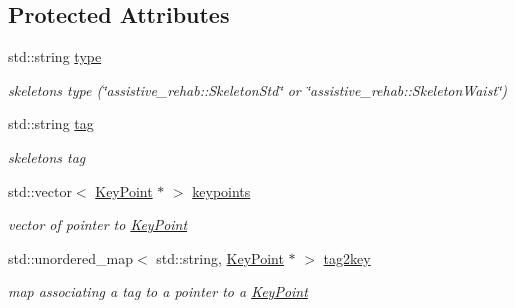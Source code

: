 \subsection*{Protected Attributes}
\begin{DoxyCompactItemize}
\item 
\mbox{\label{classassistive__rehab_1_1Skeleton_a679b826030f01f307d938e583f27d23b}} 
std\+::string \mbox{\hyperlink{classassistive__rehab_1_1Skeleton_a679b826030f01f307d938e583f27d23b}{type}}
\begin{DoxyCompactList}\small\item\em skeleton\textquotesingle{}s type (\char`\"{}assistive\+\_\+rehab\+::\+Skeleton\+Std\char`\"{} or \char`\"{}assistive\+\_\+rehab\+::\+Skeleton\+Waist\char`\"{}) \end{DoxyCompactList}\item 
\mbox{\label{classassistive__rehab_1_1Skeleton_a3d1ce5280300e012826948dc4383c2cb}} 
std\+::string \mbox{\hyperlink{classassistive__rehab_1_1Skeleton_a3d1ce5280300e012826948dc4383c2cb}{tag}}
\begin{DoxyCompactList}\small\item\em skeleton\textquotesingle{}s tag \end{DoxyCompactList}\item 
\mbox{\label{classassistive__rehab_1_1Skeleton_a5f61fbdd10430985cd6754e182226787}} 
std\+::vector$<$ \mbox{\hyperlink{classassistive__rehab_1_1KeyPoint}{Key\+Point}} $\ast$ $>$ \mbox{\hyperlink{classassistive__rehab_1_1Skeleton_a5f61fbdd10430985cd6754e182226787}{keypoints}}
\begin{DoxyCompactList}\small\item\em vector of pointer to \mbox{\hyperlink{classassistive__rehab_1_1KeyPoint}{Key\+Point}} \end{DoxyCompactList}\item 
\mbox{\label{classassistive__rehab_1_1Skeleton_ada4d4b327f1f71520e62e42db9d4c656}} 
std\+::unordered\+\_\+map$<$ std\+::string, \mbox{\hyperlink{classassistive__rehab_1_1KeyPoint}{Key\+Point}} $\ast$ $>$ \mbox{\hyperlink{classassistive__rehab_1_1Skeleton_ada4d4b327f1f71520e62e42db9d4c656}{tag2key}}
\begin{DoxyCompactList}\small\item\em map associating a tag to a pointer to a \mbox{\hyperlink{classassistive__rehab_1_1KeyPoint}{Key\+Point}} \end{DoxyCompactList}\item 
\mbox{\label{classassistive__rehab_1_1Skeleton_a4b1c3607cabb58053e4c367015e98e28}} 

\end{DoxyCompactItemize}
